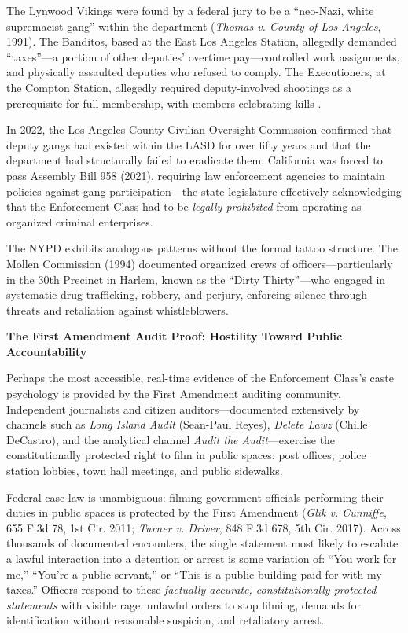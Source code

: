 The Lynwood Vikings were found by a federal jury to be a ``neo-Nazi, white supremacist gang'' within the department (\textit{Thomas v. County of Los Angeles}, 1991). The Banditos, based at the East Los Angeles Station, allegedly demanded ``taxes''---a portion of other deputies' overtime pay---controlled work assignments, and physically assaulted deputies who refused to comply. The Executioners, at the Compton Station, allegedly required deputy-involved shootings as a prerequisite for full membership, with members celebrating kills \cite{lacoversight}.

In 2022, the Los Angeles County Civilian Oversight Commission confirmed that deputy gangs had existed within the LASD for over fifty years and that the department had structurally failed to eradicate them. California was forced to pass Assembly Bill 958 (2021), requiring law enforcement agencies to maintain policies against gang participation---the state legislature effectively acknowledging that the Enforcement Class had to be \textit{legally prohibited} from operating as organized criminal enterprises.

The NYPD exhibits analogous patterns without the formal tattoo structure. The Mollen Commission (1994) documented organized crews of officers---particularly in the 30th Precinct in Harlem, known as the ``Dirty Thirty''---who engaged in systematic drug trafficking, robbery, and perjury, enforcing silence through threats and retaliation against whistleblowers.

\textbf{The First Amendment Audit Proof: Hostility Toward Public Accountability}

Perhaps the most accessible, real-time evidence of the Enforcement Class's caste psychology is provided by the First Amendment auditing community. Independent journalists and citizen auditors---documented extensively by channels such as \textit{Long Island Audit} (Sean-Paul Reyes), \textit{Delete Lawz} (Chille DeCastro), and the analytical channel \textit{Audit the Audit}---exercise the constitutionally protected right to film in public spaces: post offices, police station lobbies, town hall meetings, and public sidewalks.

Federal case law is unambiguous: filming government officials performing their duties in public spaces is protected by the First Amendment (\textit{Glik v. Cunniffe}, 655 F.3d 78, 1st Cir. 2011; \textit{Turner v. Driver}, 848 F.3d 678, 5th Cir. 2017). Across thousands of documented encounters, the single statement most likely to escalate a lawful interaction into a detention or arrest is some variation of: ``You work for me,'' ``You're a public servant,'' or ``This is a public building paid for with my taxes.'' Officers respond to these \textit{factually accurate, constitutionally protected statements} with visible rage, unlawful orders to stop filming, demands for identification without reasonable suspicion, and retaliatory arrest.

